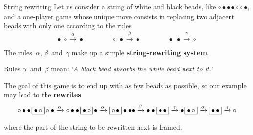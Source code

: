 %
\begin{frame}{String rewriting}
  Let us consider a string of white and black beads, like \(\circ
  \bullet \bullet \bullet \circ \circ \bullet\), and a one-player game
  whose unique move consists in replacing two adjacent beads with only
  one according to the rules
  \begin{equation*}
    \bullet \; \circ   \xrightarrow{\alpha} \bullet\qquad\qquad
    \circ   \; \bullet \xrightarrow{\beta} \bullet\qquad\qquad
    \bullet \; \bullet \xrightarrow{\gamma} \circ
  \end{equation*}

  The rules~\(\alpha\), \(\beta\)~and~\(\gamma\) make up a simple
  \textbf{string\hyp{}rewriting system}.

  \bigskip

  Rules \(\alpha\)~and~\(\beta\) mean: \emph{`A black bead absorbs the
  white bead next to it.'}

  \bigskip

  The goal of this game is to end up with as few beads as possible, so
  our example may lead to the \textbf{rewrites}
  \begin{equation*}
    \circ \bullet \bullet \, \fbox{\(\bullet \, \circ\)} \circ \bullet
    \xrightarrow{\alpha} \circ \bullet \bullet \, \fbox{\(\bullet \,
      \circ\)} \, \bullet \xrightarrow{\alpha} \fbox{\(\circ \,
      \bullet\)} \bullet \bullet \bullet \xrightarrow{\beta} \bullet
    \bullet \fbox{\(\bullet \, \bullet\)} \xrightarrow{\gamma} \bullet \,
    \fbox{\(\bullet \, \circ\)} \xrightarrow{\alpha} \fbox{\(\bullet
      \, \bullet\)} \xrightarrow{\gamma} \circ
  \end{equation*}

  \medskip

  \noindent where the part of the string to be rewritten next is
  framed.

\end{frame}

